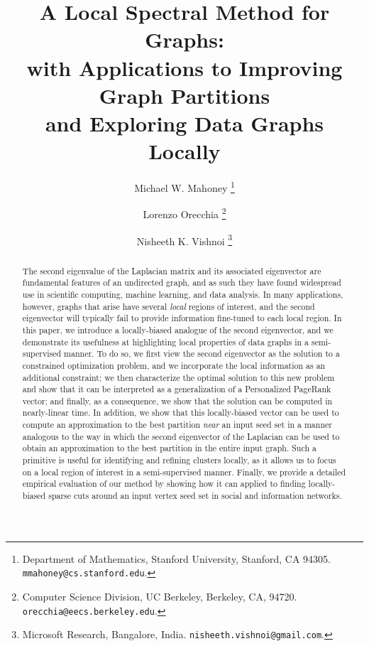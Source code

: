 \documentclass[11pt]{article}
\begin{document}
\title{A Local Spectral Method for Graphs: \\ 
with Applications to Improving Graph Partitions \\
and Exploring Data Graphs Locally}

\author{
Michael W. Mahoney
\thanks{
Department of Mathematics,
Stanford University,
Stanford, CA 94305.
{\tt mmahoney@cs.stanford.edu}.
}
\and
Lorenzo Orecchia
\thanks{
Computer Science Division, 
UC Berkeley,
Berkeley, CA, 94720.
{\tt orecchia@eecs.berkeley.edu}.
}
\and 
Nisheeth K. Vishnoi
\thanks{
Microsoft Research,
Bangalore, India.
{\tt nisheeth.vishnoi@gmail.com}.
}
}

\date{}
\maketitle




\vspace{3mm}
\begin{abstract}
The second eigenvalue of the Laplacian matrix and its associated eigenvector 
are fundamental features of an undirected graph, and as such they have found 
widespread use in scientific computing, machine learning, and data analysis.  
In many applications, however, graphs that arise have several \emph{local} 
regions of interest, and the second eigenvector will typically fail to 
provide information fine-tuned to each local region.  
In this paper, we introduce a locally-biased analogue of the second 
eigenvector, and we demonstrate its usefulness at highlighting local 
properties of data graphs in a semi-supervised manner.
To do so, we first view the second eigenvector as the solution to a 
constrained optimization problem, and we incorporate the local information 
as an additional constraint; 
we then characterize the optimal solution to this new problem and show that 
it can be interpreted as a generalization of a Personalized PageRank vector; 
and finally, as a consequence, we show that the solution can be computed in 
nearly-linear time. 
In addition, we show that this locally-biased vector can be used to compute 
an approximation to the best partition \emph{near} an input seed set in a 
manner analogous to the way in which the second eigenvector of the Laplacian 
can be used to obtain an approximation to the best partition in the entire 
input graph.
Such a primitive is useful for identifying and refining clusters locally, as 
it allows us to focus on a local region of interest in a semi-supervised 
manner.
Finally, we provide a detailed empirical evaluation of our method by showing 
how it can applied to finding locally-biased sparse cuts around an input 
vertex seed set in social and information networks.
\end{abstract}
\vspace{3mm}
\end{document}
